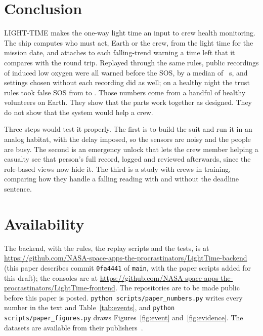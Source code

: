 \section{Conclusion}\label{sec:conclusion}

LIGHT-TIME makes the one-way light time an input to crew health monitoring. The ship computes who must act, Earth or the crew, from the light time for the mission date, and attaches to each falling-trend warning a time left that it compares with the round trip. Replayed through the same rules, \numUwEvents{} public recordings of induced low oxygen were all warned before the SOS, by a median of \numUwMedianLeadS~s, and settings chosen without each recording did as well; on a healthy night the trust rules took false SOS from \numControlFalseSosRaw{} to \numControlFalseSosSettle. Those numbers come from a handful of healthy volunteers on Earth. They show that the parts work together as designed. They do not show that the system would help a crew.

Three steps would test it properly. The first is to build the suit and run it in an analog habitat, with the delay imposed, so the sensors are noisy and the people are busy. The second is an emergency unlock that lets the crew member helping a casualty see that person's full record, logged and reviewed afterwards, since the role-based views now hide it. The third is a study with crews in training, comparing how they handle a falling reading with and without the deadline sentence.

\section*{Availability}
The backend, with the rules, the replay scripts and the tests, is at \url{https://github.com/NASA-space-apps-the-procrastinators/LightTime-backend} (this paper describes commit \texttt{0fa4441} of \texttt{main}, with the paper scripts added for this draft); the consoles are at \url{https://github.com/NASA-space-apps-the-procrastinators/LightTime-frontend}. The repositories are to be made public before this paper is posted. \texttt{python scripts/paper\_numbers.py} writes every number in the text and Table~\ref{tab:events}, and \texttt{python scripts/paper\_figures.py} draws Figures~\ref{fig:event} and~\ref{fig:evidence}. The datasets are available from their publishers~\cite{hoffman2022oximetry,physionetApnea,ppgDaliaData}.

